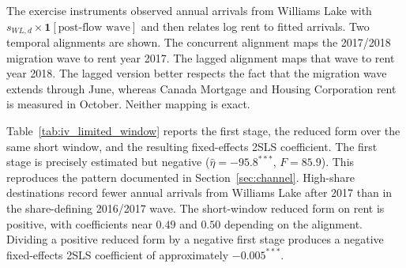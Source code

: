 \documentclass[12pt]{article}
\begin{document}
The exercise instruments observed annual arrivals from Williams Lake with
$s_{WL,d}\times \mathbf{1}[\text{post-flow wave}]$ and then relates log rent to
fitted arrivals. Two temporal alignments are shown. The concurrent alignment maps
the 2017/2018 migration wave to rent year 2017. The lagged alignment maps that
wave to rent year 2018. The lagged version better respects the fact that the
migration wave extends through June, whereas Canada Mortgage and Housing Corporation rent is measured in October.
Neither mapping is exact.

Table~\ref{tab:iv_limited_window} reports the first stage, the reduced form over
the same short window, and the resulting fixed-effects 2SLS coefficient. The first stage is precisely estimated but negative
($\hat{\eta}=-95.8^{***}$, $F=85.9$). This reproduces the pattern documented in
Section~\ref{sec:channel}. High-share destinations record fewer annual arrivals
from Williams Lake after 2017 than in the share-defining 2016/2017 wave. The
short-window reduced form on rent is positive, with coefficients near $0.49$ and
$0.50$ depending on the alignment. Dividing a positive reduced form by a negative
first stage produces a negative fixed-effects 2SLS coefficient of approximately
$-0.005^{***}$.
\end{document}
